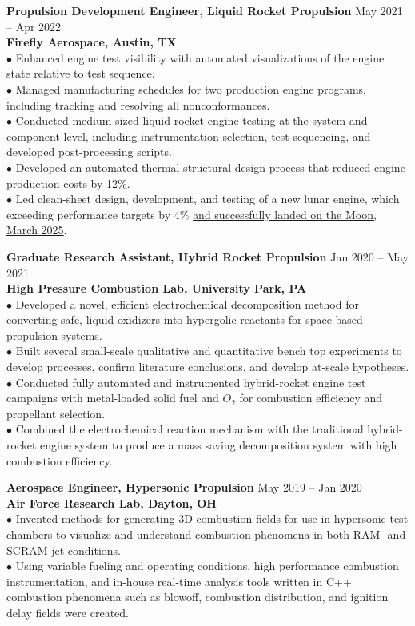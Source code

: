 \documentclass[10pt]{article}
\newcommand{\blankline}{\quad\pagebreak[2]\vspace{-0.3\baselineskip}}
\begin{document}
\textbf{Propulsion Development Engineer, Liquid Rocket Propulsion}
\hfill May 2021 -- Apr 2022 \\
\textbf{Firefly Aerospace, Austin, TX} \\
$\bullet$ Enhanced engine test visibility with automated visualizations of the engine state relative to test sequence. \\
$\bullet$ Managed manufacturing schedules for two production engine programs, including tracking and resolving all nonconformances. \\ 
$\bullet$ Conducted medium-sized liquid rocket engine testing at the system and component level, including instrumentation selection, test sequencing, and developed post-processing scripts. \\ 
$\bullet$ Developed an automated thermal-structural design process that reduced engine production costs by 12\%. \\
$\bullet$ Led clean-sheet design, development, and testing of a new lunar engine, which exceeding performance targets by 4\% \href{https://fireflyspace.com/missions/blue-ghost-mission-1/}{and successfully landed on the Moon, March 2025}.

\blankline

\textbf{Graduate Research Assistant, Hybrid Rocket Propulsion}
\hfill Jan 2020 -- May 2021 \\
\textbf{High Pressure Combustion Lab, University Park, PA} \\
$\bullet$ Developed a novel, efficient electrochemical decomposition method for converting safe, liquid oxidizers into hypergolic reactants for space-based propulsion systems. \\ 
$\bullet$ Built several small-scale qualitative and quantitative bench top experiments to develop processes, confirm literature conclusions, and develop at-scale hypotheses. \\
$\bullet$ Conducted fully automated and instrumented hybrid-rocket engine test campaigns with metal-loaded solid fuel and $O_2$ for combustion efficiency and propellant selection. \\ 
$\bullet$ Combined the electrochemical reaction mechanism with the traditional hybrid-rocket engine system to produce a mass saving decomposition system with high combustion efficiency.

\blankline

\textbf{Aerospace Engineer, Hypersonic Propulsion}
\hfill May 2019 -- Jan 2020 \\
\textbf{Air Force Research Lab, Dayton, OH} \\
$\bullet$ Invented methods for generating 3D combustion fields for use in hypersonic test chambers to visualize and understand combustion phenomena in both RAM- and SCRAM-jet conditions. \\
$\bullet$ Using variable fueling and operating conditions, high performance combustion instrumentation, and in-house real-time analysis tools written in C++ combustion phenomena such as blowoff, combustion distribution, and ignition delay fields were created. \\
\end{document}
